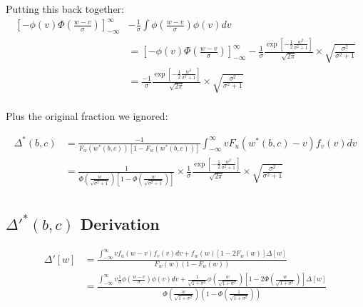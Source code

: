 \documentclass{article}
\begin{document}
Putting this back together:
\begin{align*}
 \left[
        -\phi(v) \Phi\left(\frac{w-v}{\sigma}\right) 
    \right]^\infty_{-\infty} &-\frac{1}{\sigma} \int \phi\left(\frac{w - v}{\sigma}\right) \phi(v) dv  
     \\
    &=
 \left[
        -\phi(v) \Phi\left(\frac{w-v}{\sigma}\right) 
    \right]^\infty_{-\infty} -
    \frac{1}{\sigma} \frac{
        \exp \left[
            -\frac{1}{2}\frac{w^2}{\sigma^2 + 1}
        \right]
    }{\sqrt{2\pi}} \times 
                    \sqrt{
                        \frac{\sigma^2}{\sigma^2 + 1}
                    }  \\
&=
    \frac{-1}{\sigma} \frac{
        \exp \left[
            -\frac{1}{2}\frac{w^2}{\sigma^2 + 1}
        \right]
    }{\sqrt{2\pi}} \times 
                    \sqrt{
                        \frac{\sigma^2}{\sigma^2 + 1}
                    }  \\
\end{align*}


Plus the original fraction we ignored:

\begin{align*}
    \Delta^*(b,c) &= \frac{
        -1
    }{
        F_w(w^*(b,c)) [1 - F_w(w^*(b,c))]
    } \int^\infty_{-\infty} vF_u(w^*(b,c) - v) f_v(v) dv \\
     &= 
\frac{
        1
    }{
        \Phi\left(\frac{w}{\sqrt{\sigma^2 + 1}}\right)
         \left[1 - \Phi\left(\frac{
            w
        }{
            \sqrt{\sigma^2 + 1}
        }\right)\right]
    } \times 
    \frac{1}{\sigma} \frac{
        \exp \left[
            -\frac{1}{2}\frac{w^2}{\sigma^2 + 1}
        \right]
    }{\sqrt{2\pi}} \times 
                    \sqrt{
                        \frac{\sigma^2}{\sigma^2 + 1}
                    }  \\
\end{align*}

\subsection*{$\Delta'^*(b,c)$ Derivation}


\begin{align*}
   \Delta'[w] &= 
   \frac{
    \int^\infty_{-\infty} v f_u(w - v) f_v(v) dv 
    + f_w(w) \left[
        1 - 2 F_w(w)
    \right] \Delta[w]
   }{
    F_w(w)(1 - F_w(w))
   } \\
   &= 
   \frac{
    \int^\infty_{-\infty} v \frac{1}{\sigma}\phi\left(\frac{w - v}{\sigma}\right) \phi(v) dv 
    + \frac{1}{\sqrt{1 + \sigma^2}}\phi\left(\frac{w}{\sqrt{1 + \sigma^2}}\right) \left[
        1 - 2 \Phi(\frac{w}{\sqrt{1 + \sigma^2}})
    \right] \Delta[w]
   }{
    \Phi\left(\frac{w}{\sqrt{1 + \sigma^2}}\right)\left(1 - \Phi\left(\frac{1}{\sqrt{1 + \sigma^2}}\right)\right)
   } \\
\end{align*}
\end{document}
